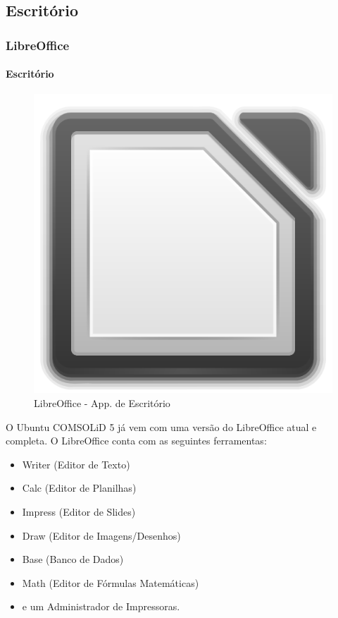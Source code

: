 \subsection{Escritório}

\begin{frame}


\end{frame}

\begin{frame}\frametitle{LibreOffice}\framesubtitle{Escritório}

\begin{figure}
\includegraphics[scale=0.4]{img/libreoffice.png}
\caption{LibreOffice - App. de Escritório}
\end{figure}

O Ubuntu COMSOLiD 5 já vem com uma versão do LibreOffice atual e completa.
O LibreOffice conta com as seguintes ferramentas:
\begin{itemize}
	\item Writer (Editor de Texto)
	\item Calc (Editor de Planilhas)
	\item Impress (Editor de Slides)
	\item Draw (Editor de Imagens/Desenhos)
	\item Base (Banco de Dados)
	\item Math (Editor de Fórmulas Matemáticas)
	\item e um Administrador de Impressoras.
\end{itemize}

\end{frame}

